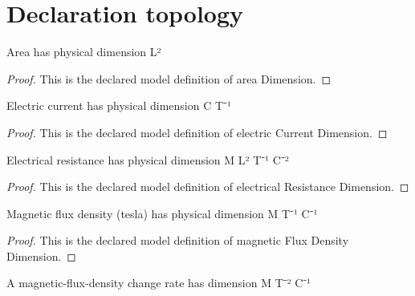 \section{Declaration topology}
\begin{definition}
  \label{def:physics:phyx-mini-0926:phyxminiproblems-problemphyxmini0926-areadimension}
  Area has physical dimension L²
\end{definition}
\begin{proof}
  This is the declared model definition of area Dimension.
\end{proof}
\begin{definition}
  \label{def:physics:phyx-mini-0926:phyxminiproblems-problemphyxmini0926-electriccurrentdimension}
  Electric current has physical dimension C T⁻¹
\end{definition}
\begin{proof}
  This is the declared model definition of electric Current Dimension.
\end{proof}
\begin{definition}
  \label{def:physics:phyx-mini-0926:phyxminiproblems-problemphyxmini0926-electricalresistancedimension}
  Electrical resistance has physical dimension M L² T⁻¹ C⁻²
\end{definition}
\begin{proof}
  This is the declared model definition of electrical Resistance Dimension.
\end{proof}
\begin{definition}
  \label{def:physics:phyx-mini-0926:phyxminiproblems-problemphyxmini0926-magneticfluxdensitydimension}
  Magnetic flux density (tesla) has physical dimension M T⁻¹ C⁻¹
\end{definition}
\begin{proof}
  This is the declared model definition of magnetic Flux Density Dimension.
\end{proof}
\begin{definition}
  \label{def:physics:phyx-mini-0926:phyxminiproblems-problemphyxmini0926-magneticfluxdensityratedimension}
  A magnetic-flux-density change rate has dimension M T⁻² C⁻¹
\end{definition}
